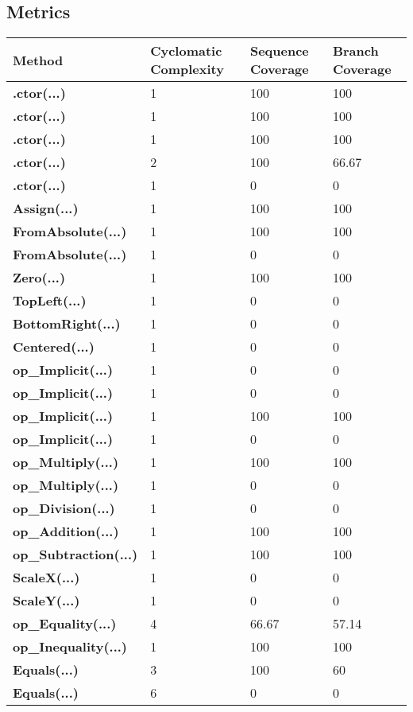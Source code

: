 \documentclass[a4paper,10pt]{article}
\begin{document}
\subsection{Metrics}
\begin{longtable}[l]{|l|l|l|l|}
\hline
\textbf{Method} & \textbf{Cyclomatic Complexity} & \textbf{Sequence Coverage} & \textbf{Branch Coverage}\\
\hline
\textbf{.ctor(...)} & 1 & 100 & 100\\
\hline
\textbf{.ctor(...)} & 1 & 100 & 100\\
\hline
\textbf{.ctor(...)} & 1 & 100 & 100\\
\hline
\textbf{.ctor(...)} & 2 & 100 & 66.67\\
\hline
\textbf{.ctor(...)} & 1 & 0 & 0\\
\hline
\textbf{Assign(...)} & 1 & 100 & 100\\
\hline
\textbf{FromAbsolute(...)} & 1 & 100 & 100\\
\hline
\textbf{FromAbsolute(...)} & 1 & 0 & 0\\
\hline
\textbf{Zero(...)} & 1 & 100 & 100\\
\hline
\textbf{TopLeft(...)} & 1 & 0 & 0\\
\hline
\textbf{BottomRight(...)} & 1 & 0 & 0\\
\hline
\textbf{Centered(...)} & 1 & 0 & 0\\
\hline
\textbf{op\_Implicit(...)} & 1 & 0 & 0\\
\hline
\textbf{op\_Implicit(...)} & 1 & 0 & 0\\
\hline
\textbf{op\_Implicit(...)} & 1 & 100 & 100\\
\hline
\textbf{op\_Implicit(...)} & 1 & 0 & 0\\
\hline
\textbf{op\_Multiply(...)} & 1 & 100 & 100\\
\hline
\textbf{op\_Multiply(...)} & 1 & 0 & 0\\
\hline
\textbf{op\_Division(...)} & 1 & 0 & 0\\
\hline
\textbf{op\_Addition(...)} & 1 & 100 & 100\\
\hline
\textbf{op\_Subtraction(...)} & 1 & 100 & 100\\
\hline
\textbf{ScaleX(...)} & 1 & 0 & 0\\
\hline
\textbf{ScaleY(...)} & 1 & 0 & 0\\
\hline
\textbf{op\_Equality(...)} & 4 & 66.67 & 57.14\\
\hline
\textbf{op\_Inequality(...)} & 1 & 100 & 100\\
\hline
\textbf{Equals(...)} & 3 & 100 & 60\\
\hline
\textbf{Equals(...)} & 6 & 0 & 0\\
\hline
\end{longtable}
\end{document}
